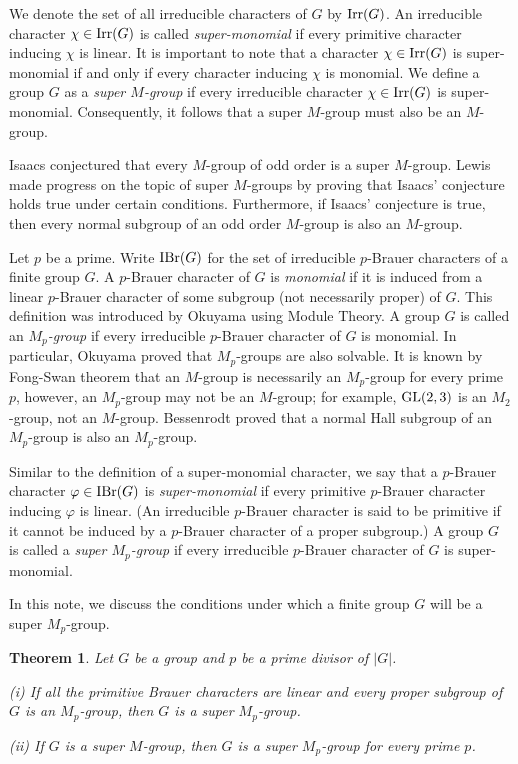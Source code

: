 \documentclass[12pt]{amsart}
\newtheorem{thm}[theorem]{Theorem}
\theoremstyle{remark}
\numberwithin{equation}{section}
\begin{document}
We denote the set of all irreducible characters of $G$ by ${\rm Irr}(G)$.
An irreducible character $\chi\in {\rm Irr}(G)$ is called {\em super-monomial}
if every primitive character inducing $\chi$ is linear.
It is important to note that a character $\chi\in {\rm Irr}(G)$ is super-monomial
if and only if every character inducing $\chi$ is monomial.
We define a group $G$ as a {\em super $M$-group} if every irreducible character $\chi\in {\rm Irr}(G)$ is super-monomial.
Consequently, it follows that a super $M$-group must also be an $M$-group.

Isaacs  \cite{Isaacs1987} conjectured that every $M$-group of odd order is a super $M$-group.
Lewis  \cite{LewisProc2010} made progress on the topic of super $M$-groups by 
proving that Isaacs' conjecture holds true under certain conditions. Furthermore, 
if Isaacs' conjecture is true, then every normal subgroup of
an odd order $M$-group is also an $M$-group.

Let $p$ be a prime. Write ${\rm IBr}(G)$ for the set of irreducible
$p$-Brauer characters of a finite group $G$. A $p$-Brauer character
of $G$ is {\em monomial} if it is induced from a linear $p$-Brauer
character of some subgroup (not necessarily proper) of $G$. This
definition was introduced by Okuyama \cite{Okuyama} using Module
Theory. A group $G$ is called an {\em $M_{p}$-group} if every
irreducible $p$-Brauer character of $G$ is monomial. In particular,
Okuyama \cite{Okuyama} proved that $M_{p}$-groups are also solvable.
It is known by Fong-Swan theorem that an $M$-group is necessarily an $M_{p}$-group for
every prime $p$, however, an $M_{p}$-group may not be an $M$-group;
for example, ${\rm GL}(2, 3)$ is an $M_{2}$-group, not an $M$-group.
Bessenrodt \cite{Bessenrodt1990} proved that a normal Hall subgroup
of an $M_{p}$-group is also an $M_{p}$-group.

Similar to the definition of a super-monomial character,
we say that a $p$-Brauer character $\varphi\in {\rm IBr}(G)$ is {\em super-monomial} if
every primitive $p$-Brauer character inducing $\varphi$ is linear.
(An irreducible $p$-Brauer character is said to be primitive if it cannot be induced
by a $p$-Brauer character of a proper subgroup.)
A group $G$ is called a {\em super $M_{p}$-group} if every irreducible $p$-Brauer character of $G$
is super-monomial.

In this note, we discuss the conditions under which a finite group $G$ will be a super $M_{p}$-group.


\begin{thm}\label{theorem1}
Let $G$ be a group and $p$ be a prime divisor of $|G|$.

{\rm (i)} If all the primitive Brauer characters are linear and
every proper subgroup of $G$ is an $M_{p}$-group,
then $G$ is a super $M_{p}$-group.

{\rm (ii)} If $G$ is a super $M$-group,
then $G$ is a super $M_{p}$-group for every prime $p$.
\end{thm}
\end{document}
